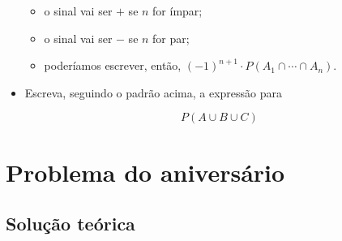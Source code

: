 \documentclass[
  11pt]{report}
\begin{document}
\begin{itemize}
  \begin{itemize}
  \item
    o sinal vai ser $+$ se $n$ for ímpar;
  \item
    o sinal vai ser $-$ se $n$ for par;
  \item
    poderíamos escrever, então, $(-1)^{n+1} \cdot P(A_1 \cap \cdots \cap A_n )$.
  \end{itemize}
\item
  Escreva, seguindo o padrão acima, a expressão para

  \[
  P(A \cup B \cup C)
  \]

\end{itemize}

\hypertarget{problema-do-aniversuxe1rio}{%
\section{Problema do aniversário}\label{problema-do-aniversuxe1rio}}

\hypertarget{soluuxe7uxe3o-teuxf3rica}{%
\subsection{Solução teórica}\label{soluuxe7uxe3o-teuxf3rica}}
\end{document}
